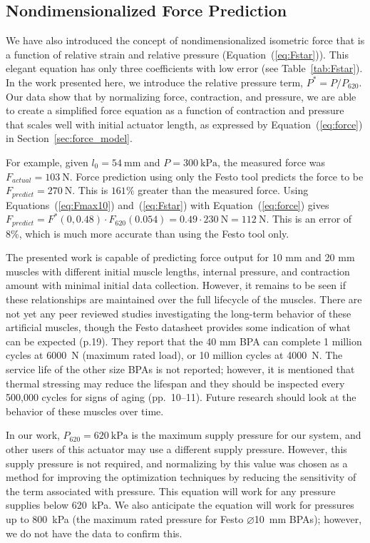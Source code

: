 \subsection{Nondimensionalized Force Prediction}

We have also introduced the concept of nondimensionalized isometric force that is a function of relative strain and relative pressure (Equation~(\ref{eq:Fstar})). This elegant equation has only three coefficients with low error (see Table~\ref{tab:Fstar}). In the work presented here, we introduce the relative pressure term, $P^*=P/P_{620}$. Our data show that by normalizing force, contraction, and pressure, we are able to create a simplified force equation as a function of contraction and pressure that scales well with initial actuator length, as expressed by Equation~(\ref{eq:force}) in Section~\ref{sec:force_model}.

For example, given $l_0=\qty{54}{\mm}$ and $P=\qty{300}{\kPa}$, the measured force was \mbox{$F_{actual} = \qty{103}{\N}$.} Force prediction using only the Festo tool predicts the force to be \mbox{$F_{predict} = \qty{270}{\N}$.} This is $161\%$ greater than the measured force. Using Equations~(\ref{eq:Fmax10}) and~(\ref{eq:Fstar}) with Equation~(\ref{eq:force}) gives $F_{predict} = F^*(0, 0.48) \cdot F_{620}(0.054) = 0.49 \cdot \qty{230}{\N} = \qty{112}{\N}$. This is an error of $8\%$, which is much more accurate than using the Festo tool only.

The presented work is capable of predicting force output for 10 mm and 20 mm muscles with different initial muscle lengths, internal pressure, and contraction amount with minimal initial data collection. However, it remains to be seen if these relationships are maintained over the full lifecycle of the muscles. There are not yet any peer reviewed studies investigating the long-term behavior of these artificial muscles, though the Festo datasheet provides some indication of what can be expected \citep{festo_2026} (p.19). They report that the 40 mm BPA can complete 1 million cycles at \qty{6000}{\N} (maximum rated load), or 10 million cycles at \qty{4000}{\N}. The service life of the other size BPAs is not reported; however, it is mentioned that thermal stressing may reduce the lifespan and they should be inspected every 500,000 cycles for signs of aging \citep{festo_2018} (pp.~10--11). Future research should look at the behavior of these muscles over time.

In our work, $P_{620}=\qty{620}{\kPa}$ is the maximum supply pressure for our system, and other users of this actuator may use a different supply pressure. However, this supply pressure is not required, and normalizing by this value was chosen as a method for improving the optimization techniques by reducing the sensitivity of the term associated with pressure. This equation will work for any pressure supplies below \qty{620}{\kPa}. We also anticipate the equation will work for pressures up to \qty{800}{\kPa} (the maximum rated pressure for Festo $\diameter$\qty{10}{\mm} BPAs); however, we do not have the data to confirm this.

